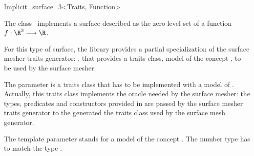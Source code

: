 

\begin{ccRefClass}{Implicit_surface_3<Traits, Function>}


\ccDefinition
  
The class \ccRefName\  implements a surface described 
as the zero level
set  of a function \begin{math}f : \R^3 \longrightarrow \R\end{math}.


For this type of surface, the library provides a partial specialization
of the  surface mesher traits generator:
,
that provides a traits class, model of the concept
,
to be used by the surface mesher.


The parameter  is a traits class 
that has to be implemented with a model of 
.
Actually, this traits class implements the oracle needed by the
surface mesher:
the types, predicates and constructors  provided
in  are
passed by the surface mesher traits generator
to the generated the traits class
used by the surface mesh generator.

The template parameter   stands for a model
of the concept .
The number type  has to match
the type .


\ccCreation
{}


\end{ccRefClass}
